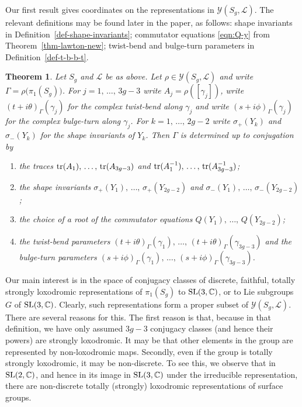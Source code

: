 \documentclass[11pt]{amsart}
\newtheorem{theorem}{Theorem}[section]
\numberwithin{equation}{section}
\begin{document}
Our first result gives coordinates on the representations in ${\mathcal Y}(S_g,{\mathcal L})$.
The relevant definitions may be found later in the paper, as follows: shape invariants in
Definition~\ref{def-shape-invariants}; commutator equations \eqref{eqn:Q-y} from 
Theorem~\ref{thm-lawton-new}; twist-bend and bulge-turn  parameters in Definition~\ref{def-t-b-b-t}.

\begin{theorem}\label{thm:main-SL(3,C)}
Let $S_g$ and ${\mathcal L}$ be as above. Let $\rho\in{\mathcal Y}(S_g,{\mathcal L})$ and write
$\Gamma=\rho\bigl(\pi_1(S_g)\bigr)$.
For $j=1,\,\ldots,\,3g-3$ write $A_j=\rho([\gamma_j])$, write $(t+i\theta)_\Gamma(\gamma_j)$ 
for the complex twist-bend along $\gamma_j$ and write $(s+i\phi)_\Gamma(\gamma_j)$ 
for the complex bulge-turn along $\gamma_j$. For $k=1,\,\ldots,\,2g-2$ write 
$\sigma_+(Y_k)$ and $\sigma_-(Y_k)$ for the shape invariants of $Y_k$. 
Then $\Gamma$ is determined up to conjugation by
\begin{enumerate}
\item[(1)] the traces ${\rm tr}(A_1),\,\ldots,\,{\rm tr}(A_{3g-3})$ and ${\rm tr}(A_1^{-1}),\,\ldots,\,{\rm tr}(A_{3g-3}^{-1})$;
\item[(2)] the shape invariants $\sigma_+(Y_1),\,\ldots,\, \sigma_+(Y_{2g-2})$ and 
$\sigma_-(Y_1),\,\ldots,\, \sigma_-(Y_{2g-2})$; 
\item[(3)] the choice of a root of the commutator equations $Q(Y_1),\,\ldots,\,Q(Y_{2g-2})$; 
\item[(4)] the twist-bend parameters $(t+i\theta)_\Gamma(\gamma_1),\,\ldots,\,(t+i\theta)_\Gamma(\gamma_{3g-3})$
and the bulge-turn parameters $(s+i\phi)_\Gamma(\gamma_1),\,\ldots,\,(s+i\phi)_\Gamma(\gamma_{3g-3})$.
\end{enumerate}
\end{theorem}

Our main interest is in the space of conjugacy classes of discrete, faithful, totally strongly loxodromic representations
of $\pi_1(S_g)$ to ${\rm SL}(3,{\mathbb C})$, or to Lie subgroups $G$ of ${\rm SL}(3,{\mathbb C})$. Clearly, such
representations form a proper subset of ${\mathcal Y}(S_g,{\mathcal L})$. There are several reasons for this. 
The first reason is that, because in that definition, we have only assumed $3g-3$ conjugacy classes (and hence their powers) 
are strongly loxodromic. It may be that other elements in the group are represented by non-loxodromic maps. Secondly,
even if the group is totally strongly loxodromic, it may be non-discrete. To see this, we observe that in 
${\rm SL}(2,{\mathbb C})$, and hence in its image in ${\rm SL}(3,{\mathbb C})$ under the irreducible representation,
there are non-discrete totally (strongly) loxodromic representations of surface groups. 
\end{document}
